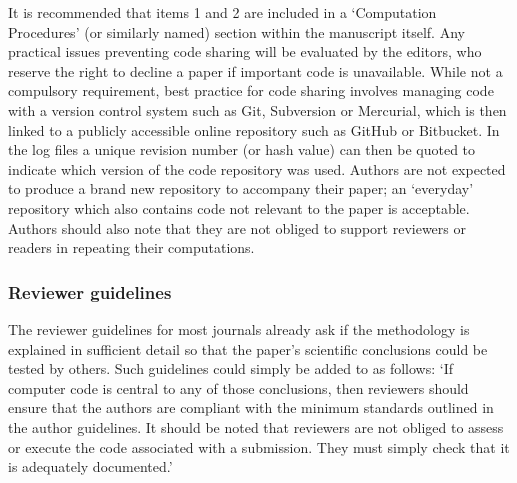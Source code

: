 It is recommended that items 1 and 2 are included in a `Computation Procedures' (or similarly named) section within the manuscript itself. Any practical issues preventing code sharing will be evaluated by the editors, who reserve the right to decline a paper if important code is unavailable. While not a compulsory requirement, best practice for code sharing involves managing code with a version control system such as Git, Subversion or Mercurial, which is then linked to a publicly accessible online repository such as GitHub or Bitbucket. In the log files a unique revision number (or hash value) can then be quoted to indicate which version of the code repository was used. Authors are not expected to produce a brand new repository to accompany their paper; an `everyday' repository which also contains code not relevant to the paper is acceptable. Authors should also note that they are not obliged to support reviewers or readers in repeating their computations.

\subsubsection{Reviewer guidelines}

The reviewer guidelines for most journals already ask if the methodology is explained in sufficient detail so that the paper's scientific conclusions could be tested by others. Such guidelines could simply be added to as follows: `If computer code is central to any of those conclusions, then reviewers should ensure that the authors are compliant with the minimum standards outlined in the author guidelines. It should be noted that reviewers are not obliged to assess or execute the code associated with a submission. They must simply check that it is adequately documented.'   
  
 
    
  
  
  
  
  
  
  
  
  
  
  
  